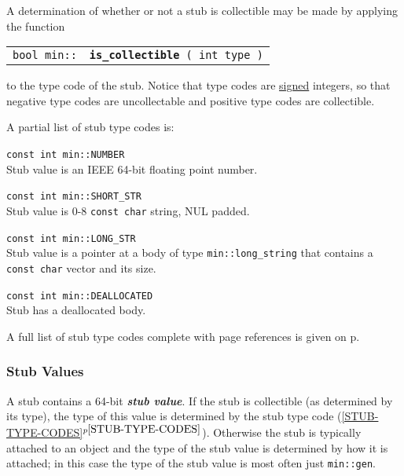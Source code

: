 \documentclass[12pt]{article}
\makeatletter
\newcommand{\key}[1]{{\bf \em #1}\index{#1}}
\newcommand{\ttindex}[1]{\index{#1@{\tt #1}}}
\newcommand{\minindex}[1]{\ttindex{min::#1}\ttindex{#1}}
\newcommand{\itemref}[1]{\ref{#1}$^{p\pageref{#1}}$}
\newcommand{\pagref}[1]{p\pageref{#1}}
\newcommand{\EOL}{\penalty \exhyphenpenalty}
\newenvironment{indpar}[1][0.3in]%
	{\begin{list}{}%
		     {\setlength{\itemsep}{0in}%
		      \setlength{\topsep}{0in}%
		      \setlength{\parsep}{1ex}%
		      \setlength{\labelwidth}{#1}%
		      \setlength{\leftmargin}{#1}%
		      \addtolength{\leftmargin}{\labelsep}}%
	 \item}%
	{\end{list}}
\newcommand{\LABEL}[1]{\label{#1}}
\newcommand{\MINKEY}[1]{{\tt \bf #1}\minindex{#1}}
\makeatother
\begin{document}
A determination of whether or not a stub is collectible may be made
by applying the function

\begin{indpar}\begin{tabular}{r@{}l}
\verb|bool min::| & \MINKEY{is\_collectible}\verb| ( int type )|
\LABEL{MIN::IS_COLLECTIBLE}
\end{tabular}\end{indpar}

to the type code of the stub.  Notice that type codes are \underline{signed}
integers, so that negative type codes are uncollectable and positive type codes
are collectible.

A partial list of stub type codes is:

\begin{indpar}
\begin{list}{}{}
\item[{\tt const int min::NUMBER}]~\\
Stub value is an IEEE 64-bit floating point number.
\item[{\tt const int min::SHORT\_STR}]~\\
Stub value is 0-8 \verb|const char| string, NUL padded.
\item[{\tt const int min::LONG\_STR}]~\\
Stub value is a pointer at a body of type {\tt min::long\_\EOL string}
that contains a \verb|const char| vector and its size. 
\item[{\tt const int min::DEALLOCATED}]~\\
Stub has a deallocated body.
\end{list}
\end{indpar}

A full list of stub type codes complete with page references
is given on \pagref{STUB-TYPE-CODE-LIST}.

\subsubsection{Stub Values}
\label{STUB-VALUES}

A stub contains a 64-bit \key{stub value}.  If the stub is collectible
(as determined by its type), the type of this value
is determined by the stub type code (\itemref{STUB-TYPE-CODES}).
Otherwise the stub is typically attached to an object and the type of the stub
value is determined by how it is attached; in this case the type of the
stub value is most often just \verb|min::gen|.
\end{document}
